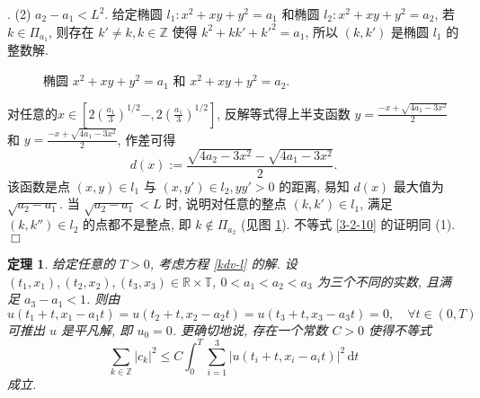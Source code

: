 \documentclass[master]{cugthesis}
\newcommand\R{\ensuremath{\mathbb{R}}}
\newcommand\Z{\ensuremath{\mathbb{Z}}}
\newcommand\T{\ensuremath{\mathbb{T}}}
\renewcommand\d{\ensuremath{\,\mathrm{d}}}
\newtheorem{theorem}{定理}[chapter]
\newenvironment{proof}{{\noindent\itshape 证明}.}{\hfill $\Box$\par}
\begin{document}
\begin{proof}
  (2) $a_2-a_1<L^2$. 给定椭圆 $l_1:x^2+xy+y^2=a_1$ 和椭圆 $l_2:x^2+xy+y^2=a_2$, 若 $k\in \Pi_{a_1}$, 则存在 $k'\neq k,k\in \Z$ 使得 $k^2+kk'+k'^2=a_1$, 所以 $(k,k')$ 是椭圆 $l_1$ 的整数解.
  
       \begin{figure}[ht]
        \centering
        \caption{椭圆 $x^2+xy+y^2=a_1$ 和 $x^2+xy+y^2=a_2$.}
        \label{fig7}
    \end{figure}
  
  对任意的$x\in \left[2\left(\frac{a_1}{3}\right)^{1 /2}-,2\left(\frac{a_1}{3}\right)^{1 /2}\right]$, 反解等式得上半支函数 $y=\frac{-x+\sqrt{4a_1-3x^2}}{2}$ 和 $y=\frac{-x+\sqrt{4a_1-3x^2}}{2}$, 作差可得
  \begin{equation}
      d(x):=\frac{\sqrt{4a_2-3x^2}-\sqrt{4a_1-3x^2}}{2}.
  \end{equation}
  该函数是点 $(x,y)\in l_1$ 与 $(x,y')\in l_2, yy'>0$ 的距离, 易知 $d(x)$ 最大值为 $\sqrt{a_2-a_1}$. 当 $\sqrt{a_2-a_1}<L$ 时, 说明对任意的整点 $(k,k')\in l_1$, 满足 $(k,k'')\in l_2$ 的点都不是整点, 即 $k\notin \Pi_{a_2}$ (见图 \ref{fig7}). 不等式 \eqref{3-2-10} 的证明同 (1).
      \end{proof}
      
\begin{theorem}
给定任意的 $T>0$, 考虑方程 \eqref{kdv-l} 的解. 设 $(t_1,x_1), (t_2,x_2),(t_3,x_3)\in \R\times \T$, $0<a_1<a_2<a_3$ 为三个不同的实数, 且满足 $a_3 - a_1 <1$. 则由 
\begin{equation*}
    u(t_1+t,x_1-a_1t)=u(t_2+t,x_2-a_2 t)=u(t_3+t,x_3-a_3t)=0, \quad \forall t\in (0,T)
\end{equation*}
可推出 $u$ 是平凡解, 即 $u_0=0$. 更确切地说, 存在一个常数 $C>0$ 使得不等式
\begin{equation}
            \sum_{k\in\Z} |c_k|^2\le C\int_0^T\sum\limits_{i=1}^3|u(t_i+t,x_i-a_it)|^2 \d t
\end{equation}
成立.
\end{theorem}
\end{document}
